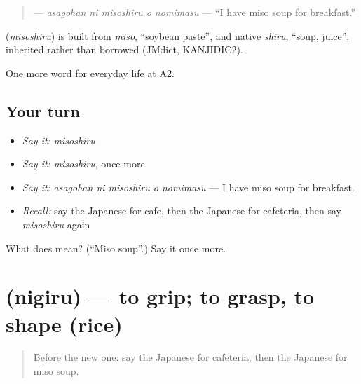 \begin{quote}
\textbf{  } — \emph{asagohan ni misoshiru o nomimasu} — \textquotedblleft{}I have miso soup for breakfast.\textquotedblright{}
\end{quote}

\begin{cousinweb}
\textbf{} (\emph{misoshiru}) is built from \emph{miso}, \textquotedblleft{}soybean paste\textquotedblright{}, and native \emph{shiru}, \textquotedblleft{}soup, juice\textquotedblright{}, inherited rather than borrowed (JMdict, KANJIDIC2).
\end{cousinweb}

\begin{grammarlens}[title={What you've built}]
One more word for everyday life at A2.
\end{grammarlens}

\subsection*{Your turn}
\begin{itemize}
\raggedright
  \item \emph{Say it:} \emph{misoshiru}
  \item \emph{Say it:} \emph{misoshiru}, once more
  \item \emph{Say it:} \emph{asagohan ni misoshiru o nomimasu} — I have miso soup for breakfast.
  \item \emph{Recall:} say the Japanese for cafe, then the Japanese for cafeteria, then say \emph{misoshiru} again
\end{itemize}

\begin{tcolorbox}[breakable,colback=teal!4,colframe=teal!35!black,title={Before you move on}]
What does  mean? (\textquotedblleft{}Miso soup\textquotedblright{}.) Say it once more.
\end{tcolorbox}
\section[\texorpdfstring{\ja{にぎる} (nigiru)}{にぎる (nigiru)}]{ (nigiru) — to grip; to grasp, to shape (rice)}

\label{lesson:JA-C180-nigiru}



\begin{quote}
Before the new one: say the Japanese for cafeteria, then the Japanese for miso soup.
\end{quote}

